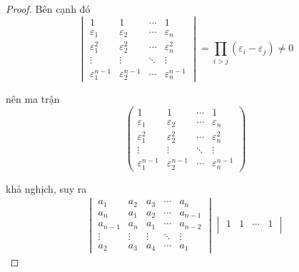 \documentclass[class=nhvh-linear-algebra,crop=false]{standalone}
\begin{document}
\begin{proof}
    \par Bên cạnh đó
    \[
        \begin{vmatrix}
            1                     & 1                     & \cdots & 1                     \\
            \varepsilon_{1}       & \varepsilon_{2}       & \cdots & \varepsilon_{n}       \\
            \varepsilon_{1}^{2}   & \varepsilon_{2}^{2}   & \cdots & \varepsilon_{n}^{2}   \\
            \vdots                & \vdots                & \ddots & \vdots                \\
            \varepsilon_{1}^{n-1} & \varepsilon_{2}^{n-1} & \cdots & \varepsilon_{n}^{n-1}
        \end{vmatrix}
        = \prod_{i>j}(\varepsilon_{i} - \varepsilon_{j}) \ne 0
    \]
    \par nên ma trận
    \[
        \begin{pmatrix}
            1                     & 1                     & \cdots & 1                     \\
            \varepsilon_{1}       & \varepsilon_{2}       & \cdots & \varepsilon_{n}       \\
            \varepsilon_{1}^{2}   & \varepsilon_{2}^{2}   & \cdots & \varepsilon_{n}^{2}   \\
            \vdots                & \vdots                & \ddots & \vdots                \\
            \varepsilon_{1}^{n-1} & \varepsilon_{2}^{n-1} & \cdots & \varepsilon_{n}^{n-1}
        \end{pmatrix}
    \]
    \par khả nghịch, suy ra
    \begin{align*}
        \begin{vmatrix}
            a_{1}   & a_{2}  & a_{3}  & \cdots & a_{n}   \\
            a_{n}   & a_{1}  & a_{2}  & \cdots & a_{n-1} \\
            a_{n-1} & a_{n}  & a_{1}  & \cdots & a_{n-2} \\
            \vdots  & \vdots & \vdots & \ddots & \vdots  \\
            a_{2}   & a_{3}  & a_{4}  & \cdots & a_{1}
        \end{vmatrix}
        \begin{vmatrix}
            1                     & 1                     & \cdots & 1                     \\

\end{vmatrix}
\end{align*}
\end{proof}
\end{document}
